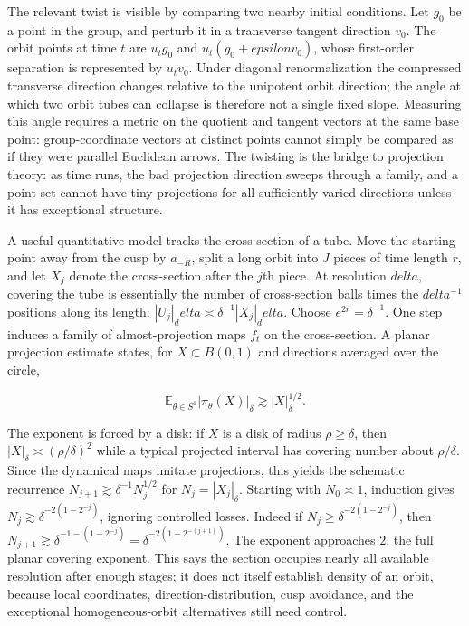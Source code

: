 The relevant twist is visible by comparing two nearby initial conditions. Let \(g_0\) be a point in the group, and perturb it in a transverse tangent direction \(v_0\). The orbit points at time \(t\) are \(u_tg_0\) and \(u_t(g_0+epsilon v_0)\), whose first-order separation is represented by \(u_t v_0\). Under diagonal renormalization the compressed transverse direction changes relative to the unipotent orbit direction; the angle at which two orbit tubes can collapse is therefore not a single fixed slope. Measuring this angle requires a metric on the quotient and tangent vectors at the same base point: group-coordinate vectors at distinct points cannot simply be compared as if they were parallel Euclidean arrows. The twisting is the bridge to projection theory: as time runs, the bad projection direction sweeps through a family, and a point set cannot have tiny projections for all sufficiently varied directions unless it has exceptional structure.

A useful quantitative model tracks the cross-section of a tube. Move the starting point away from the cusp by \(a_{-R}\), split a long orbit into \(J\) pieces of time length \(r\), and let \(X_j\) denote the cross-section after the \(j\)th piece. At resolution \(delta\), covering the tube is essentially the number of cross-section balls times the \(delta^{-1}\) positions along its length: \(|U_j|_delta\asymp \delta^{-1}|X_j|_delta\). Choose \(e^{2r}=\delta^{-1}\). One step induces a family of almost-projection maps \(f_t\) on the cross-section. A planar projection estimate states, for \(X\subset B(0,1)\) and directions averaged over the circle,

\[\mathbb E_{\theta\in S^1}|\pi_\theta(X)|_\delta\gtrsim |X|_\delta^{1/2}.\]

The exponent is forced by a disk: if \(X\) is a disk of radius \(\rho\ge\delta\), then \(|X|_\delta\asymp(\rho/\delta)^2\) while a typical projected interval has covering number about \(\rho/\delta\). Since the dynamical maps imitate projections, this yields the schematic recurrence \(N_{j+1}\gtrsim\delta^{-1}N_j^{1/2}\) for \(N_j=|X_j|_\delta\). Starting with \(N_0\asymp1\), induction gives \(N_j\gtrsim\delta^{-2(1-2^{-j})}\), ignoring controlled losses. Indeed if \(N_j\ge\delta^{-2(1-2^{-j})}\), then \(N_{j+1}\gtrsim\delta^{-1-(1-2^{-j})}=\delta^{-2(1-2^{-(j+1)})}\). The exponent approaches \(2\), the full planar covering exponent. This says the section occupies nearly all available resolution after enough stages; it does not itself establish density of an orbit, because local coordinates, direction-distribution, cusp avoidance, and the exceptional homogeneous-orbit alternatives still need control.

